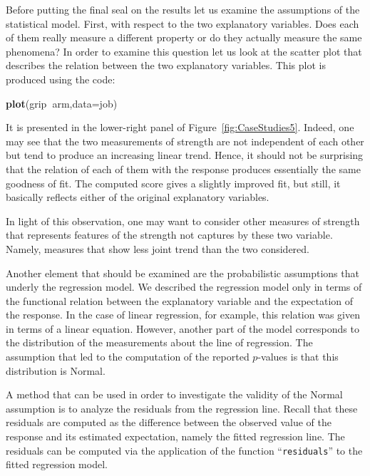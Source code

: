 \documentclass[]{krantz}
\makeatletter
\newenvironment{Shaded}{\begin{snugshade}}{\end{snugshade}}
\newcommand{\KeywordTok}[1]{\textcolor[rgb]{0.13,0.29,0.53}{\textbf{#1}}}
\newcommand{\DataTypeTok}[1]{\textcolor[rgb]{0.13,0.29,0.53}{#1}}
\newcommand{\OperatorTok}[1]{\textcolor[rgb]{0.81,0.36,0.00}{\textbf{#1}}}
\newcommand{\NormalTok}[1]{#1}
\newenvironment{kframe}{%
\medskip{}
\setlength{\fboxsep}{.8em}
 \def\at@end@of@kframe{}%
 \ifinner\ifhmode%
  \def\at@end@of@kframe{\end{minipage}}%
  \begin{minipage}{\columnwidth}%
 \fi\fi%
 \def\FrameCommand##1{\hskip\@totalleftmargin \hskip-\fboxsep
 \colorbox{shadecolor}{##1}\hskip-\fboxsep
     \hskip-\linewidth \hskip-\@totalleftmargin \hskip\columnwidth}%
 \MakeFramed {\advance\hsize-\width
   \@totalleftmargin\z@ \linewidth\hsize
   \@setminipage}}%
 {\par\unskip\endMakeFramed%
 \at@end@of@kframe}
\renewenvironment{Shaded}{\begin{kframe}}{\end{kframe}}
\theoremstyle{definition}
\theoremstyle{definition}
\theoremstyle{definition}
\theoremstyle{remark}
\makeatother
\begin{document}
Before putting the final seal on the results let us examine the
assumptions of the statistical model. First, with respect to the two
explanatory variables. Does each of them really measure a different
property or do they actually measure the same phenomena? In order to
examine this question let us look at the scatter plot that describes the
relation between the two explanatory variables. This plot is produced
using the code:

\begin{Shaded}
\begin{Highlighting}[]
\KeywordTok{plot}\NormalTok{(grip}\OperatorTok{~}\NormalTok{arm,}\DataTypeTok{data=}\NormalTok{job)}
\end{Highlighting}
\end{Shaded}

It is presented in the lower-right panel of
Figure~\ref{fig:CaseStudies5}. Indeed, one may see that the two
measurements of strength are not independent of each other but tend to
produce an increasing linear trend. Hence, it should not be surprising
that the relation of each of them with the response produces essentially
the same goodness of fit. The computed score gives a slightly improved
fit, but still, it basically reflects either of the original explanatory
variables.

In light of this observation, one may want to consider other measures of
strength that represents features of the strength not captures by these
two variable. Namely, measures that show less joint trend than the two
considered.

Another element that should be examined are the probabilistic
assumptions that underly the regression model. We described the
regression model only in terms of the functional relation between the
explanatory variable and the expectation of the response. In the case of
linear regression, for example, this relation was given in terms of a
linear equation. However, another part of the model corresponds to the
distribution of the measurements about the line of regression. The
assumption that led to the computation of the reported \(p\)-values is
that this distribution is Normal.

A method that can be used in order to investigate the validity of the
Normal assumption is to analyze the residuals from the regression line.
Recall that these residuals are computed as the difference between the
observed value of the response and its estimated expectation, namely the
fitted regression line. The residuals can be computed via the
application of the function ``\texttt{residuals}'' to the fitted
regression model.
\end{document}
